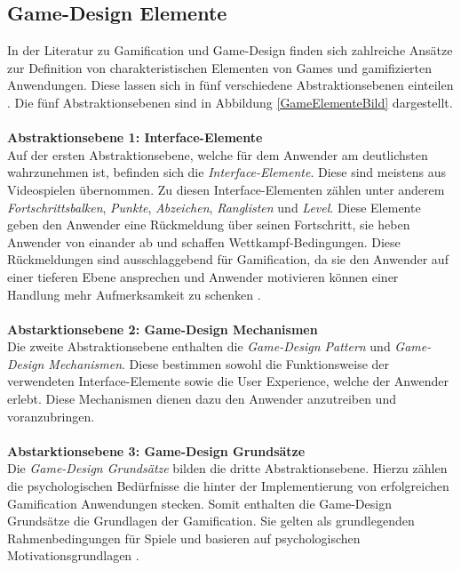 \documentclass[a4paper,12pt,twoside]{scrartcl}
\begin{document}
\subsection{Game-Design Elemente}
In der Literatur zu Gamification und Game-Design finden sich zahlreiche Ansätze zur Definition von charakteristischen Elementen von Games und gamifizierten Anwendungen. Diese lassen sich in fünf verschiedene Abstraktionsebenen einteilen \cite{Deterding2011}. Die fünf Abstraktionsebenen sind in Abbildung \ref{GameElementeBild} dargestellt.
\\\\
\textbf{Abstraktionsebene 1: Interface-Elemente}\\
Auf der ersten Abstraktionsebene, welche für dem Anwender am deutlichsten wahrzunehmen ist, befinden sich die \textit{Interface-Elemente}. Diese sind meistens aus Videospielen übernommen. Zu diesen Interface-Elementen zählen unter anderem \textit{Fortschrittsbalken}, \textit{Punkte}, \textit{Abzeichen}, \textit{Ranglisten} und \textit{Level}. Diese Elemente geben den Anwender eine Rückmeldung über seinen Fortschritt, sie heben Anwender von einander ab und schaffen Wettkampf-Bedingungen. Diese Rückmeldungen sind ausschlaggebend für Gamification, da sie den Anwender auf einer tieferen Ebene ansprechen und Anwender motivieren können einer Handlung mehr Aufmerksamkeit zu schenken \cite{GameElemente2018}.
\\\\
\textbf{Abstarktionsebene 2: Game-Design Mechanismen}\\
Die zweite Abstraktionsebene enthalten die \textit{Game-Design Pattern} und \textit{Game-Design Mechanismen}. Diese bestimmen sowohl die Funktionsweise der verwendeten Interface-Elemente sowie die User Experience, welche der Anwender erlebt. Diese Mechanismen dienen dazu den Anwender anzutreiben und voranzubringen.
\\\\
\textbf{Abstarktionsebene 3: Game-Design Grundsätze}\\
Die \textit{Game-Design Grundsätze} bilden die dritte Abstraktionsebene. Hierzu zählen die psychologischen Bedürfnisse die hinter der Implementierung von erfolgreichen Gamification Anwendungen stecken. Somit enthalten die Game-Design Grundsätze die Grundlagen der Gamification. Sie gelten als grundlegenden Rahmenbedingungen für Spiele und basieren auf psychologischen Motivationsgrundlagen \cite{Werbach2012}. 
\end{document}
